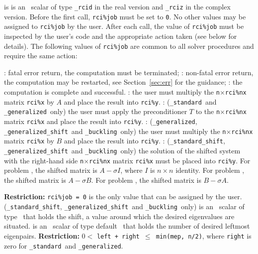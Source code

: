 \begin{description}
%
 is is an \intentinout\ scalar  of type
{\tt \solver\_rcid} in the real version and
{\tt \solver\_rciz} in the complex version.
Before the first call, {\tt rci\%job} must be set to {\tt 0}.
No other values may be assigned to {\tt rci\%job} by the user.
After each call,
the value of {\tt rci\%job} must be inspected by the user's code
and the appropriate action taken (see below for details).
The following values of {\tt rci\%job}
are common to all solver procedures 
and require the same action: 
%
\begin{description}
%
: fatal error return, the computation must be terminated;
%
: 
non-fatal error return, the computation may be restarted,
see Section~\ref{sec:err} for the guidance;
%
: the computation is complete and successful.
%
: 
the user must multiply the {\tt n}$\times${\tt rci\%nx} matrix
{\tt rci\%x} by $A$ and place the result into {\tt rci\%y}.
%
: 
({\tt\solver\_standard}\ and {\tt\solver\_generalized}\ only)
the user must
apply the preconditioner $T$ to the {\tt n}$\times${\tt rci\%nx} matrix
{\tt rci\%x} and place the result into {\tt rci\%y}.
%
: 
({\tt\solver\_generalized}, {\tt\solver\_generalized\_shift}\
and {\tt\solver\_buckling}\ only)
the user must multiply the {\tt n}$\times${\tt rci\%nx} matrix
{\tt rci\%x} by $B$ and place the result into {\tt rci\%y}.
%
:
({\tt\solver\_standard\_shift}, {\tt\solver\_generalized\_shift}\
and {\tt\solver\_buckling}\ only)
the solution of the shifted system
with the right-hand side {\tt n}$\times${\tt rci\%nx} matrix {\tt rci\%x}
must be placed into {\tt rci\%y}.
For problem \Ref{evp}, the shifted matrix is $A - \sigma I$,
where $I$ is $n\times n$ identity.
For problem \Ref{evp.g}, the shifted matrix is $A - \sigma B$.
For problem \Ref{evp.b}, the shifted matrix is $B - \sigma A$.
%
\end{description}
%
{\bf Restriction:} 
{\tt rci\%job = 0} is the only value that can be assigned by the user.
%
\itt{sigma} 
({\tt \solver\_standard\_shift}, {\tt \solver\_generalized\_shift}\
and {\tt \solver\_buckling}\ only)
is an \intentin\ scalar of type \REALDP\
that holds the shift, 
a value around which the desired eigenvalues %
are situated.
%
\itt{left} is an \intentin\ scalar of type default \Integer\ 
that holds the number of desired leftmost eigenpairs.
{\bf Restriction:} {$0 <$ \tt left + right $\le$ min(mep, n/2)},
where {\tt right} is zero for 
{\tt\solver\_standard}\ and {\tt\solver\_generalized}.

\end{description}
